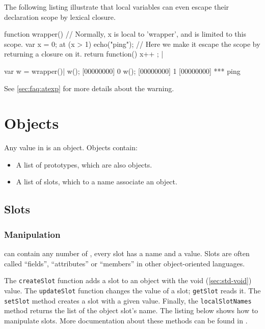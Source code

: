 The following listing illustrate that local variables can even
escape their declaration scope by lexical closure.

\begin{urbiscript}[firstnumber=last]
function wrapper()
{
  // Normally, x is local to 'wrapper', and is limited to this scope.
  var x = 0;
  at (x > 1)
    echo("ping");
  // Here we make it escape the scope by returning a closure on it.
  return function() { x++ };
} |

var w = wrapper()|
w();
[00000000] 0
w();
[00000000] 1
[00000000] *** ping
\end{urbiscript}

See \autoref{sec:faq:atexp} for more details about the warning.


\section{Objects}

Any value in \us is an object. Objects contain:

\begin{itemize}
\item A list of prototypes, which are also objects.
\item A list of slots, which to a name associate an object.
\end{itemize}

\subsection{Slots}

\subsubsection{Manipulation}

 can contain any number of , every slot has a
name and a value. Slots are often called ``fields'', ``attributes'' or
``members'' in other object-oriented languages.

The \lstinline|createSlot| function adds a slot to an object with the
void (\autoref{sec:std-void}) value. The \lstinline|updateSlot|
function changes the value of a slot; \lstinline|getSlot| reads
it. The \lstinline|setSlot| method creates a slot with a given
value. Finally, the \lstinline|localSlotNames| method returns the list of
the object slot's name. The listing below shows how to manipulate
slots. More documentation about these methods can be found in
.

